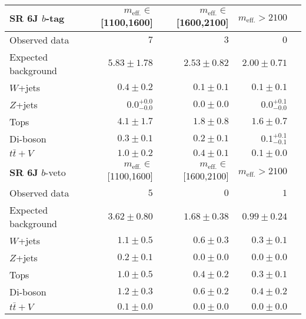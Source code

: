 \begin{tabular*}{\textwidth}{@{\extracolsep{\fill}}lrrrr}
\toprule
\textbf{SR 6J} $b$-tag &  $m_{\mathrm{eff.}}\in$[1100,1600] & $m_{\mathrm{eff.}}\in$[1600,2100] & $m_{\mathrm{eff.}}>2100$ \\
\midrule

Observed data          & $7$              & $3$              & $0$                    \\
\midrule
Expected background         & $5.83 \pm 1.78$          & $2.53 \pm 0.82$          & $2.00 \pm 0.71$              \\
\midrule
        $W$+jets         & $0.4 \pm 0.2$          & $0.1 \pm 0.1$          & $0.1 \pm 0.1$              \\
        $Z$+jets         & $0.0_{-0.0}^{+0.0}$          & $0.0 \pm 0.0$          & $0.0_{-0.0}^{+0.1}$              \\
        Tops         & $4.1 \pm 1.7$          & $1.8 \pm 0.8$          & $1.6 \pm 0.7$              \\
        Di-boson         & $0.3 \pm 0.1$          & $0.2 \pm 0.1$          & $0.1_{-0.1}^{+0.1}$              \\
        $t\bar{t}+V$         & $1.0 \pm 0.2$          & $0.4 \pm 0.1$          & $0.1 \pm 0.0$              \\
\toprule
\textbf{SR 6J} $b$-veto &  $m_{\mathrm{eff.}}\in$[1100,1600] & $m_{\mathrm{eff.}}\in$[1600,2100] & $m_{\mathrm{eff.}}>2100$ \\
\midrule
Observed data          & $5$              & $0$              & $1$                    \\
\midrule
Expected background         & $3.62 \pm 0.80$          & $1.68 \pm 0.38$          & $0.99 \pm 0.24$              \\
\midrule
        $W$+jets         & $1.1 \pm 0.5$          & $0.6 \pm 0.3$          & $0.3 \pm 0.1$              \\
        $Z$+jets         & $0.2 \pm 0.1$          & $0.0 \pm 0.0$          & $0.0 \pm 0.0$              \\
        Tops         & $1.0 \pm 0.5$          & $0.4 \pm 0.2$          & $0.3 \pm 0.1$              \\
        Di-boson         & $1.2 \pm 0.3$          & $0.6 \pm 0.2$          & $0.4 \pm 0.2$              \\
        $t\bar{t}+V$         & $0.1 \pm 0.0$          & $0.0 \pm 0.0$          & $0.0 \pm 0.0$              \\


\bottomrule
\end{tabular*}




